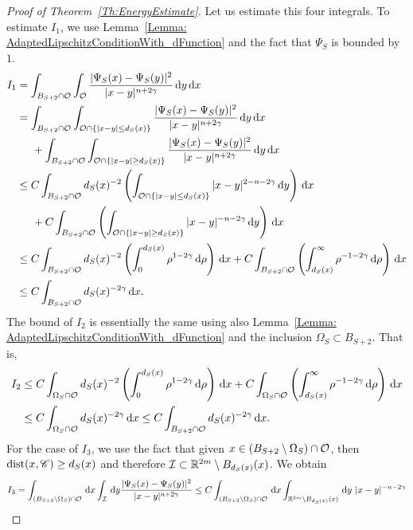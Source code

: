 \begin{proof}[Proof of Theorem~\ref{Th:EnergyEstimate}]
Let us estimate this four integrals. To estimate $I_1$, we use Lemma~\eqref{Lemma: AdaptedLipschitzConditionWith_dFunction} and the fact that $\Psi_S$ is bounded by $1$.
\begin{align*}
I_1 &= \int_{B_{S+2} \cap \mathcal{O}} \int_{\mathcal{O}} \frac{|\Psi_S(x)-\Psi_S(y)|^2}{|x-y|^{n+2\gamma}} \,\mathrm{d} y\,\mathrm{d} x\\
&= \int_{B_{S+2} \cap \mathcal{O}} \int_{\mathcal{O}\cap\{|x-y|\leq d_S(x)\}} \frac{|\Psi_S(x)-\Psi_S(y)|^2}{|x-y|^{n+2\gamma}} \,\mathrm{d} y\,\mathrm{d} x\\
&\hspace{5mm} + \int_{B_{S+2} \cap \mathcal{O}} \int_{\mathcal{O}\cap\{|x-y|\geq d_S(x)\}} \frac{|\Psi_S(x)-\Psi_S(y)|^2}{|x-y|^{n+2\gamma}} \,\mathrm{d} y\,\mathrm{d} x\\
&\leq C \int_{B_{S+2} \cap \mathcal{O}} d_S(x)^{-2}\left(\int_{\mathcal{O}\cap\{|x-y|\leq d_S(x)\}} |x-y|^{2-n-2\gamma} \,\mathrm{d} y\right)\,\mathrm{d} x\\
&\hspace{5mm} + C \int_{B_{S+2} \cap \mathcal{O}} \left(\int_{\mathcal{O}\cap\{|x-y|\geq d_S(x)\}} |x-y|^{-n-2\gamma} \,\mathrm{d} y \right)\,\mathrm{d} x\\
&\leq C \int_{B_{S+2} \cap \mathcal{O}} d_S(x)^{-2}\left(\int_0^{d_S(x)} \rho^{1-2\gamma} \,\mathrm{d} \rho\right)\,\mathrm{d} x + C \int_{B_{S+2} \cap \mathcal{O}}  \left(\int_{d_S(x)}^\infty \rho^{-1-2\gamma} \,\mathrm{d}\rho\right) \,\mathrm{d} x\\
&\leq C \int_{B_{S+2} \cap \mathcal{O}} d_S(x)^{-2\gamma} \,\mathrm{d} x.
\end{align*}
The bound of $I_2$ is essentially the same using also Lemma~\ref{Lemma: AdaptedLipschitzConditionWith_dFunction} and the inclusion $\Omega_S \subset B_{S+2}$. That is,
\begin{align*}
I_2 &\leq C \int_{\Omega_S \cap \mathcal{O}} d_S(x)^{-2}\left(\int_0^{d_S(x)} \rho^{1-2\gamma} \,\mathrm{d} \rho\right)\,\mathrm{d} x + C \int_{\Omega_S \cap \mathcal{O}} \left( \int_{d_S(x)}^\infty \rho^{-1-2\gamma} \,\mathrm{d}\rho \right) \,\mathrm{d} x\\
&\leq C \int_{\Omega _S\cap \mathcal{O}} d_S(x)^{-2\gamma} \,\mathrm{d} x \leq C \int_{B_{S+2} \cap \mathcal{O}} d_S(x)^{-2\gamma} \,\mathrm{d} x.
\end{align*}
For the case of $I_3$, we use the fact that given $x\in (B_{S+2}\setminus \Omega_S)\cap \mathcal{O}$, then $\operatorname{dist}(x,\mathscr{C})\geq d_S(x)$ and therefore $\mathcal{I} \subset \mathbb{R}^{2m}\setminus B_{d_S(x)}(x)$. We obtain
\begin{align*}
I_3 &= \int_{(B_{S+2}\setminus \Omega_S) \cap \ocal} \d x \int_{\ical} \d y \frac{|\Psi_S(x)-\Psi_S(y)|^2}{|x-y|^{n+2\s}} \leq C \int_{(B_{S+2}\setminus \Omega_S) \cap \ocal} \d x \int_{\R^{2m}\setminus B_{d_S(x)}(x)} \d y \ |x-y|^{-n-2\s} \\

\end{align*}
\end{proof}
